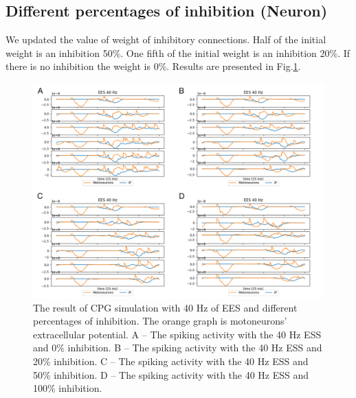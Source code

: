 \documentclass[]{elsarticle}
\begin{document}


\subsection{Different percentages of inhibition (Neuron)}

We updated the value of weight of inhibitory connections. Half of the initial weight is an inhibition 50\%. One fifth of the initial weight is an inhibition 20\%. If there is no inhibition the weight is 0\%. Results are presented in Fig.\ref{fig:40_0}.

\begin{figure}[ht!]
	\centering
	\includegraphics[width=1.0\textwidth]{results/diff_inh.png}
	\caption{The result of CPG simulation with 40 Hz of EES and different percentages of inhibition. The orange graph is motoneurons' extracellular potential. 
    A -- The spiking activity with the 40 Hz ESS and 0\% inhibition. 
    B -- The spiking activity with the 40 Hz ESS and 20\% inhibition. 
    C -- The spiking activity with the 40 Hz ESS and 50\% inhibition. 
    D -- The spiking activity with the 40 Hz ESS and 100\% inhibition.}
    \label{fig:40_0}
\end{figure}
\end{document}
